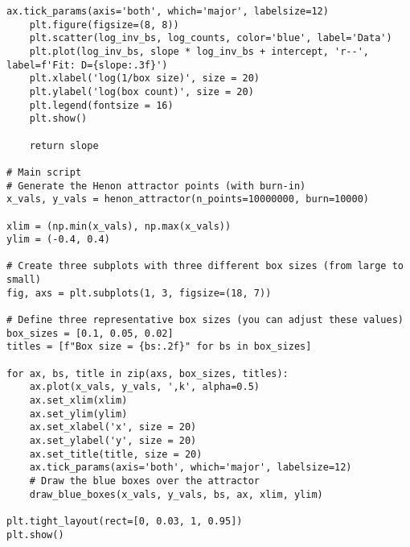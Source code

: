 \begin{lstlisting}[style=python]
    ax.tick_params(axis='both', which='major', labelsize=12)
    plt.figure(figsize=(8, 8))
    plt.scatter(log_inv_bs, log_counts, color='blue', label='Data')
    plt.plot(log_inv_bs, slope * log_inv_bs + intercept, 'r--', label=f'Fit: D={slope:.3f}')
    plt.xlabel('log(1/box size)', size = 20)
    plt.ylabel('log(box count)', size = 20)
    plt.legend(fontsize = 16)
    plt.show()
    
    return slope

# Main script
# Generate the Henon attractor points (with burn-in)
x_vals, y_vals = henon_attractor(n_points=10000000, burn=10000)

xlim = (np.min(x_vals), np.max(x_vals))
ylim = (-0.4, 0.4)

# Create three subplots with three different box sizes (from large to small)
fig, axs = plt.subplots(1, 3, figsize=(18, 7))

# Define three representative box sizes (you can adjust these values)
box_sizes = [0.1, 0.05, 0.02]
titles = [f"Box size = {bs:.2f}" for bs in box_sizes]

for ax, bs, title in zip(axs, box_sizes, titles):
    ax.plot(x_vals, y_vals, ',k', alpha=0.5)
    ax.set_xlim(xlim)
    ax.set_ylim(ylim)
    ax.set_xlabel('x', size = 20)
    ax.set_ylabel('y', size = 20)
    ax.set_title(title, size = 20)
    ax.tick_params(axis='both', which='major', labelsize=12)
    # Draw the blue boxes over the attractor
    draw_blue_boxes(x_vals, y_vals, bs, ax, xlim, ylim)

plt.tight_layout(rect=[0, 0.03, 1, 0.95])
plt.show()
\end{lstlisting}\label{boxalg}